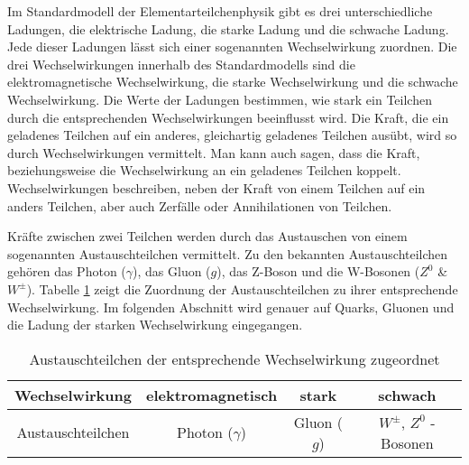 Im Standardmodell der Elementarteilchenphysik gibt es drei unterschiedliche Ladungen, die elektrische Ladung, die starke Ladung und die schwache Ladung.
Jede dieser Ladungen l\"asst sich einer sogenannten Wechselwirkung zuordnen.
Die drei Wechselwirkungen innerhalb des Standardmodells sind die elektromagnetische Wechselwirkung, die starke Wechselwirkung und die schwache Wechselwirkung.
Die Werte der Ladungen bestimmen, wie stark ein Teilchen durch die entsprechenden Wechselwirkungen beeinflusst wird.
Die Kraft, die ein geladenes Teilchen auf ein anderes, gleichartig geladenes Teilchen aus\"ubt, wird so durch Wechselwirkungen vermittelt.
Man kann auch sagen, dass die Kraft, beziehungsweise die Wechselwirkung an ein geladenes Teilchen koppelt.
Wechselwirkungen beschreiben, neben der Kraft von einem Teilchen auf ein anders Teilchen, aber auch Zerf\"alle oder Annihilationen von Teilchen.

Kr\"afte zwischen zwei Teilchen werden durch das Austauschen von einem sogenannten Austauschteilchen vermittelt.
Zu den bekannten Austauschteilchen geh\"oren das Photon ($\gamma$), das Gluon ($g$), das Z-Boson und die W-Bosonen ($Z^{0}$ \& $W^{\pm}$).
Tabelle \ref{tab:Austeilchen} zeigt die Zuordnung der Austauschteilchen zu ihrer entsprechende Wechselwirkung.
Im folgenden Abschnitt wird genauer auf Quarks, Gluonen und die Ladung der starken Wechselwirkung eingegangen.

\begin{table}[h]
\centering
\begin{tabular}{|c||c|c|c|}
\hline
Wechselwirkung    & elektromagnetisch & stark       & schwach                      \\ \hline
Austauschteilchen & Photon ($\gamma$) & Gluon ($g$) & $W^{\pm}$, $Z^{0}$ - Bosonen \\ \hline
\end{tabular}
\caption{Austauschteilchen der entsprechende Wechselwirkung zugeordnet}
\label{tab:Austeilchen}
\end{table}
